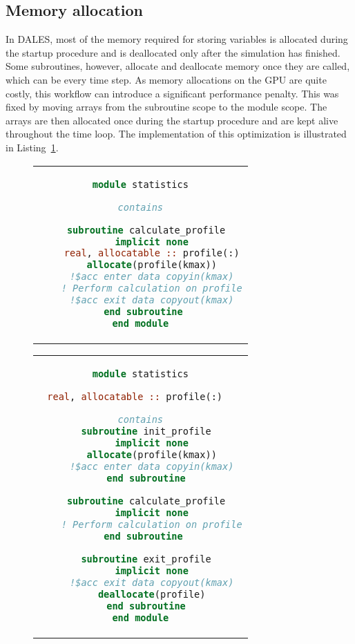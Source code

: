 \subsection{Memory allocation}
In DALES, most of the memory required for storing variables is allocated during the startup procedure and is deallocated only after the simulation has finished. Some subroutines, however, allocate and deallocate memory once they are called, which can be every time step. As memory allocations on the GPU are quite costly, this workflow can introduce a significant performance penalty. This was fixed by moving arrays from the subroutine scope to the module scope. The arrays are then allocated once during the startup procedure and are kept alive throughout the time loop. The implementation of this optimization is illustrated in Listing~\ref{lst:memory_allocation}. 

\begin{figure}[H]
  \centering
  \label{lst:memory_allocation}
  \begin{adjustbox}{valign=t, minipage=0.48\linewidth}
    \centering
    \begin{tabular}{c}
      \begin{lstlisting}[language=Fortran]
module statistics

contains

  subroutine calculate_profile
    implicit none
    real, allocatable :: profile(:)
    allocate(profile(kmax))
    !$acc enter data copyin(kmax)
    ! Perform calculation on profile
    !$acc exit data copyout(kmax)
  end subroutine 
end module
      \end{lstlisting}
    \end{tabular}
  \end{adjustbox}
  \hfill
  \begin{adjustbox}{valign=t, minipage=0.48\linewidth}
    \centering
    \begin{tabular}{c}
      \begin{lstlisting}[language=Fortran]
module statistics

real, allocatable :: profile(:)  

contains
  subroutine init_profile
    implicit none
    allocate(profile(kmax))
    !$acc enter data copyin(kmax)
  end subroutine

  subroutine calculate_profile
    implicit none
    ! Perform calculation on profile
  end subroutine 

  subroutine exit_profile
    implicit none
    !$acc exit data copyout(kmax)
    deallocate(profile)
  end subroutine
end module
      \end{lstlisting}
    \end{tabular}
  \end{adjustbox}
\end{figure}

